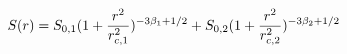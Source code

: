 \documentclass{article}
\begin{document}
\begin{equation}
  S(r)=S_{0,1}(1+\frac{r^2}{r_{c,1}^2})^{-3\beta_1+1/2}+S_{0,2}(1+\frac{r^2}{r_{c,2}^2})^{-3\beta_2+1/2}\notag
\end{equation}
\end{document}
